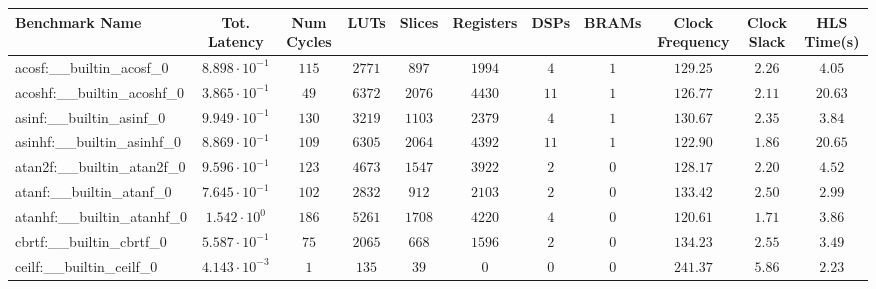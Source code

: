 \begin{tabular}{|l|c|c|c|c|c|c|c|c|c|c|}
\hline
Benchmark Name                            & Tot. Latency            & Num Cycles & LUTs       & Slices    & Registers & DSPs    & BRAMs & Clock Frequency & Clock Slack & HLS Time(s) \\
\hline
acosf:\_\_builtin\_acosf\_0               & $ 8.898 \cdot 10^{-1} $ & $ 115    $ & $ 2771   $ & $ 897   $ & $ 1994  $ & $ 4   $ & $ 1 $ & $ 129.25      $ & $ 2.26    $ & $ 4.05    $ \\
acoshf:\_\_builtin\_acoshf\_0             & $ 3.865 \cdot 10^{-1} $ & $ 49     $ & $ 6372   $ & $ 2076  $ & $ 4430  $ & $ 11  $ & $ 1 $ & $ 126.77      $ & $ 2.11    $ & $ 20.63   $ \\
asinf:\_\_builtin\_asinf\_0               & $ 9.949 \cdot 10^{-1} $ & $ 130    $ & $ 3219   $ & $ 1103  $ & $ 2379  $ & $ 4   $ & $ 1 $ & $ 130.67      $ & $ 2.35    $ & $ 3.84    $ \\
asinhf:\_\_builtin\_asinhf\_0             & $ 8.869 \cdot 10^{-1} $ & $ 109    $ & $ 6305   $ & $ 2064  $ & $ 4392  $ & $ 11  $ & $ 1 $ & $ 122.90      $ & $ 1.86    $ & $ 20.65   $ \\
atan2f:\_\_builtin\_atan2f\_0             & $ 9.596 \cdot 10^{-1} $ & $ 123    $ & $ 4673   $ & $ 1547  $ & $ 3922  $ & $ 2   $ & $ 0 $ & $ 128.17      $ & $ 2.20    $ & $ 4.52    $ \\
atanf:\_\_builtin\_atanf\_0               & $ 7.645 \cdot 10^{-1} $ & $ 102    $ & $ 2832   $ & $ 912   $ & $ 2103  $ & $ 2   $ & $ 0 $ & $ 133.42      $ & $ 2.50    $ & $ 2.99    $ \\
atanhf:\_\_builtin\_atanhf\_0             & $ 1.542 \cdot 10^{0}  $ & $ 186    $ & $ 5261   $ & $ 1708  $ & $ 4220  $ & $ 4   $ & $ 0 $ & $ 120.61      $ & $ 1.71    $ & $ 3.86    $ \\
cbrtf:\_\_builtin\_cbrtf\_0               & $ 5.587 \cdot 10^{-1} $ & $ 75     $ & $ 2065   $ & $ 668   $ & $ 1596  $ & $ 2   $ & $ 0 $ & $ 134.23      $ & $ 2.55    $ & $ 3.49    $ \\
ceilf:\_\_builtin\_ceilf\_0               & $ 4.143 \cdot 10^{-3} $ & $ 1      $ & $ 135    $ & $ 39    $ & $ 0     $ & $ 0   $ & $ 0 $ & $ 241.37      $ & $ 5.86    $ & $ 2.23    $ \\

\end{tabular}
